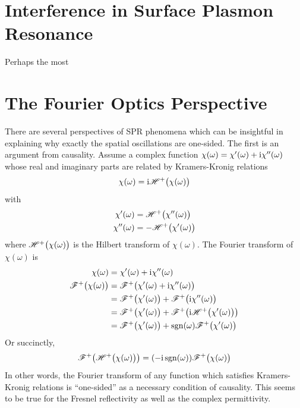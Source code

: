 \documentclass[a4paper,titlepage,onecolumn]{report}
\begin{document}
\section{Interference in Surface Plasmon Resonance}
Perhaps the most 

\section{The Fourier Optics Perspective}
There are several perspectives of SPR phenomena which can be insightful in
explaining why exactly the spatial oscillations are one-sided.  The first
is an argument from causality.  Assume a complex function $\chi(\omega) =
\chi'(\omega) + {\mathrm{i}} \chi''(\omega)$ whose real and imaginary parts are
related by Kramers-Kronig relations
\begin{align}
\chi(\omega)={\mathrm{i}} {\mathscr{H}^{+}\bigl(\chi(\omega)\bigr)}
\end{align}
with 
\begin{align}
\chi'(\omega) &= {\mathscr{H}^{+}\bigl(\chi''(\omega)\bigr)}\\
\chi''(\omega) &= -{\mathscr{H}^{+}\bigl(\chi'(\omega)\bigr)}
\end{align}
where ${\mathscr{H}^{+}\bigl(\chi(\omega)\bigr)}$ is the Hilbert transform of $\chi(\omega)$.
The Fourier transform of $\chi(\omega)$ is
\begin{align}
\chi(\omega) &= \chi'(\omega) + {\mathrm{i}} \chi''(\omega)\\
{\mathscr{F}^{+}\bigl(\chi(\omega)\bigr)} &= {\mathscr{F}^{+}\bigl(\chi'(\omega) + {\mathrm{i}} \chi''(\omega)\bigr)}\\
&= {\mathscr{F}^{+}\bigl(\chi'(\omega)\bigr)} + {\mathscr{F}^{+}\bigl({\mathrm{i}} \chi''(\omega)\bigr)}\\
&= {\mathscr{F}^{+}\bigl(\chi'(\omega)\bigr)} + {\mathscr{F}^{+}\bigl({\mathrm{i}} {\mathscr{H}^{+}\bigl(\chi'(\omega)\bigr)}\bigr)} \\
&= {\mathscr{F}^{+}\bigl(\chi'(\omega)\bigr)} + \operatorname{sgn}(\omega) {\mathscr{F}^{+}\bigl(\chi'(\omega)\bigr)} \\
\end{align}
Or succinctly,
\begin{align}
{\mathscr{F}^{+}\bigl({\mathscr{H}^{+}\bigl(\chi(\omega)\bigr)}\bigr)} = (-{\mathrm{i}} \operatorname{sgn}(\omega)) {\mathscr{F}^{+}\bigl(\chi(\omega)\bigr)}
\end{align}
In other words, the Fourier transform of any function which satisfies
Kramers-Kronig relations is ``one-sided'' as a necessary
condition of causality.  This seems to be true for the Fresnel
reflectivity as well as the complex permittivity.
\end{document}
